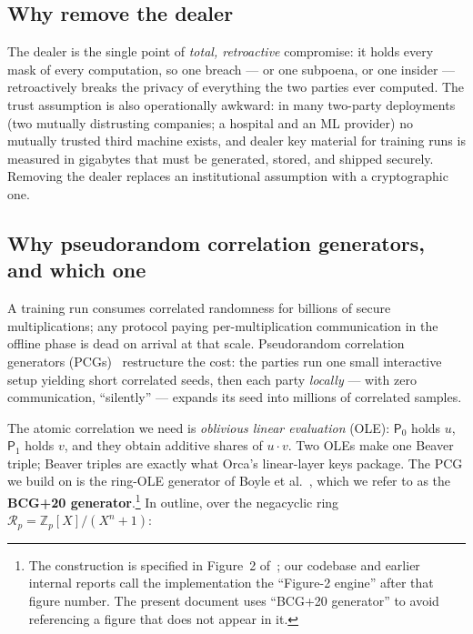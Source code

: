 \documentclass[11pt]{article}
\newcommand{\Z}{\mathbb{Z}}
\newcommand{\Ring}{\mathcal{R}}
\newcommand{\ServerZero}{\mathsf{P}_0}
\newcommand{\ServerOne}{\mathsf{P}_1}
\begin{document}
\subsection{Why remove the dealer}
\label{sec:motivation-dealer}

The dealer is the single point of \emph{total, retroactive} compromise: it
holds every mask of every computation, so one breach --- or one subpoena, or
one insider --- retroactively breaks the privacy of everything the two parties
ever computed. The trust assumption is also operationally awkward: in many
two-party deployments (two mutually distrusting companies; a hospital and an
ML provider) no mutually trusted third machine exists, and dealer key material
for training runs is measured in gigabytes that must be generated, stored, and
shipped securely. Removing the dealer replaces an institutional assumption
with a cryptographic one.

\subsection{Why pseudorandom correlation generators, and which one}
\label{sec:motivation-pcg}

A training run consumes correlated randomness for billions of secure
multiplications; any protocol paying per-multiplication communication in the
offline phase is dead on arrival at that scale. Pseudorandom correlation
generators (PCGs)~\cite{boyle2019efficient,boyle2020ringlpn} restructure the
cost: the parties run one small interactive setup yielding short correlated
seeds, then each party \emph{locally} --- with zero communication,
``silently'' --- expands its seed into millions of correlated samples.

The atomic correlation we need is \emph{oblivious linear evaluation} (OLE):
$\ServerZero$ holds $u$, $\ServerOne$ holds $v$, and they obtain additive
shares of $u\cdot v$. Two OLEs make one Beaver triple; Beaver triples are
exactly what Orca's linear-layer keys package. The PCG we build on is the
ring-OLE generator of Boyle et al.~\cite{boyle2020ringlpn}, which we refer to
as the \textbf{BCG+20 generator}.\footnote{The construction is specified in
Figure~2 of~\cite{boyle2020ringlpn}; our codebase and earlier internal reports
call the implementation the ``Figure-2 engine'' after that figure number. The
present document uses ``BCG+20 generator'' to avoid referencing a figure that
does not appear in it.} In outline, over the negacyclic ring
$\Ring_p = \Z_p[X]/(X^n+1)$:
\end{document}
